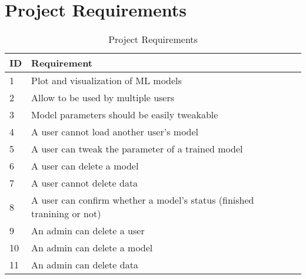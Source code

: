 \documentclass[11pt]{article}
\begin{document}
\section{Project Requirements}

\begin{table}[htb]
 \small
 \centering
  \begin{tabular}{|l|l|l|l|}
  \hline
  \bf ID & \bf Requirement                                                           \\ \hline
       1 & Plot and visualization of ML models                                       \\
       2 & Allow to be used by multiple users                                        \\
       3 & Model parameters should be easily tweakable                               \\
       4 & A user cannot load another user's model                                   \\
       5 & A user can tweak the parameter of a trained model                         \\
       6 & A user can delete a model                                                 \\
       7 & A user cannot delete data                                                 \\
       8 & A user can confirm whether a model's status (finished tranining or not)   \\
       9 & An admin can delete a user                                                \\
      10 & An admin can delete a model                                               \\
      11 & An admin can delete data                                                  \\
  \hline
  \end{tabular}
 \caption{Project Requirements} 
\end{table}
\end{document}

